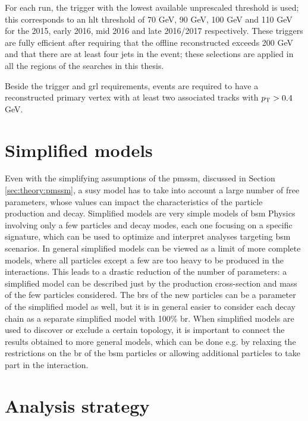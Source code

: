 For each run, the \met trigger with the lowest available unprescaled threshold is used; this corresponds to an \gls{hlt} threshold of 
70 GeV, 90 GeV, 100 GeV and 110 GeV for the 2015, early 2016, mid 2016 and late 2016/2017 respectively. 
These triggers are fully efficient after requiring that the offline reconstructed \met exceeds 200 GeV and that there are at 
least four jets in the event; these selections are applied in all the regions of the searches in this thesis. 

Beside the trigger and \gls{grl} requirements, 
events are required to have a reconstructed primary vertex with at least two associated tracks with $p_{\rm T} > 0.4$ GeV. 


\section{Simplified models}
\label{sec:simplified_models}

Even with the simplifying assumptions of the \gls{pmssm}, discussed in Section \ref{sec:theory:pmssm}, a \gls{susy} model has to take into account a large number of free parameters, whose values can impact the characteristics of the particle production and decay. 
Simplified models \cite{Alves:2011wf} are very simple models of \gls{bsm} Physics involving only a few particles and decay modes, 
each one focusing on a specific signature, which can be used to optimize and interpret analyses targeting \gls{bsm} scenarios. 
In general simplified models can be viewed as a limit of more complete models, where all particles except a few are too heavy to be 
produced in the interactions. This leads to a drastic reduction of the number of parameters: a simplified model can be described just by the production cross-section and mass of the few particles considered. 
The \glspl{br} of the new particles can be a parameter of the simplified model as well, but it is in general easier to consider each decay chain as a separate simplified model with 100\% \gls{br}.
When simplified models are used to discover or exclude a certain topology, it is important to connect the results obtained to more general models, 
which can be done e.g. by relaxing the restrictions on the \gls{br} of the \gls{bsm} particles or allowing additional particles to take part in the interaction.

\section{Analysis strategy}
\label{sec:analysisstrategy}

